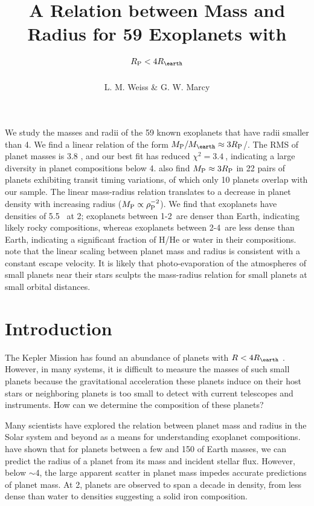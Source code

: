 \documentclass[11pt]{aastex}
\title{A Relation between Mass and Radius for 59 Exoplanets with $\rpl <  \rspecial$}
\author{L. M. Weiss \& G. W. Marcy}
\newcommand{\chisquared}{3.4~}
\newcommand{\rms}{3.8 \mearth}
\begin{document}
\maketitle
We study the masses and radii of the 59 known exoplanets that have radii smaller than 4\rearth.  We find a linear relation of the form $\mpl/\mearth \approx 3\rpl$/\rearth.  The RMS of planet masses is \rms, and our best fit has reduced $\chi^2=\chisquared$, indicating a large diversity in planet compositions below 4\rearth.   \citet{WL2013} also find $M_{\rm P} \approx 3R_{\rm P}$ in 22 pairs of planets exhibiting transit timing variations, of which only 10 planets overlap with our sample.  The linear mass-radius relation translates to a decrease in planet density with increasing radius ($M_{\rm P} \propto \rho_{\rm P}^{-2}$).  We find that exoplanets have densities of 5.5 \gcc\ at 2\rearth; exoplanets between 1-2\rearth\ are denser than Earth, indicating likely rocky compositions, whereas exoplanets between 2-4\rearth\ are less dense than Earth, indicating a significant fraction of H/He or water in their compositions. \citet{WL2013} note that the linear scaling between planet mass and radius is consistent with a constant escape velocity.  It is likely that photo-evaporation of the atmospheres of small planets near their stars sculpts the mass-radius relation for small planets at small orbital distances.

\section{Introduction}

The Kepler Mission has found an abundance of planets with  $R < 4\rearth$ \citep{Batalha2013}.  However, in many systems, it is difficult to measure the masses of such small planets because the gravitational acceleration these planets induce on their host stars or neighboring planets is too small to detect with current telescopes and instruments.  How can we determine the composition of these planets?

Many scientists have explored the relation between planet mass and radius in the Solar system and beyond as a means for understanding exoplanet compositions\citep{Lissauer2011, Enoch2012, Kane2012, Seager2007}.  \citet{Weiss2013} have shown that for planets between a few and 150 of Earth masses, we can predict the radius of a planet from its mass and incident stellar flux.  However, below $\sim$4\rearth, the large apparent scatter in planet mass impedes accurate predictions of planet mass.  At 2\rearth, planets are observed to span a decade in density, from less dense than water to densities suggesting a solid iron composition.
\end{document}
